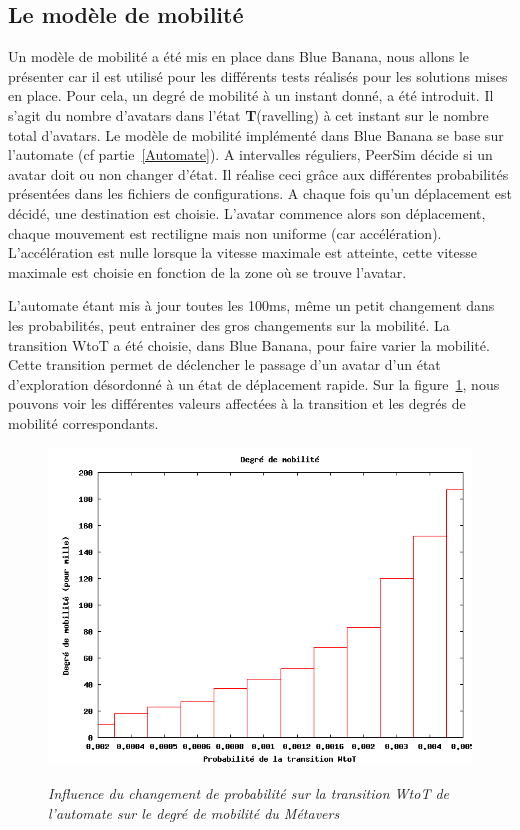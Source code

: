 \subsection{Le modèle de mobilité}

Un modèle de mobilité a été mis en place dans Blue Banana, nous allons le présenter car il est utilisé pour les différents tests réalisés pour les solutions mises en place. Pour cela, un degré de mobilité à un instant donné, a été introduit. Il s'agit du nombre d'avatars dans l'état \textbf{T}(ravelling) à cet instant sur le nombre total d'avatars. Le modèle de mobilité implémenté dans Blue Banana se base sur l'automate (cf partie~\ref{Automate}). A intervalles réguliers, PeerSim décide si un avatar doit ou non changer d'état. Il réalise ceci grâce aux différentes probabilités présentées dans les fichiers de configurations. A chaque fois qu'un déplacement est décidé, une destination est choisie. L'avatar commence alors son déplacement, chaque mouvement est rectiligne mais non uniforme (car accélération). L'accélération est nulle lorsque la vitesse maximale est atteinte, cette vitesse maximale est choisie en fonction de la zone où se trouve l'avatar.


\par L'automate étant mis à jour toutes les 100ms, même un petit changement dans les probabilités, peut entrainer des gros changements sur la mobilité. La transition WtoT a été choisie, dans Blue Banana, pour faire varier la mobilité. Cette transition permet de déclencher le passage d'un avatar d'un état d'exploration désordonné à un état de déplacement rapide. Sur la figure~\ref{fig:mobility}, nous pouvons voir les différentes valeurs affectées à la transition et les degrés de mobilité correspondants. 

\begin{figure}
  \begin{center}
    \includegraphics[scale=0.40]{./Ressources/Images/mobility.png} \\
    \caption{\textit{\small Influence du changement de probabilité sur
        la transition WtoT de l'automate sur le degré de mobilité du
        Métavers}}
    \label{fig:mobility}
  \end{center}
\end{figure}


